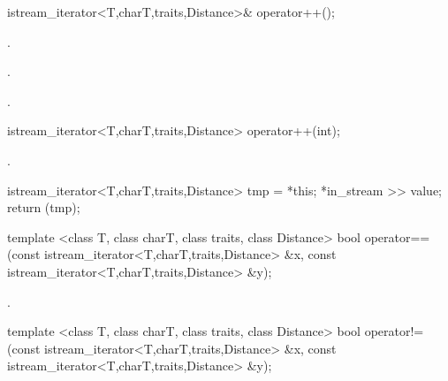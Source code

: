 %
%
\begin{itemdecl}
istream_iterator<T,charT,traits,Distance>& operator++();
\end{itemdecl}

\begin{itemdescr}
\pnum
\requires {}.

\pnum
\effects
{}.

\pnum
\returns
{}.
\end{itemdescr}

%
%
\begin{itemdecl}
istream_iterator<T,charT,traits,Distance> operator++(int);
\end{itemdecl}

\begin{itemdescr}
\pnum
\requires {}.

\pnum
\effects
\begin{codeblock}
istream_iterator<T,charT,traits,Distance> tmp = *this;
*in_stream >> value;
return (tmp);
\end{codeblock}
\end{itemdescr}

%
%
\begin{itemdecl}
template <class T, class charT, class traits, class Distance>
  bool operator==(const istream_iterator<T,charT,traits,Distance> &x,
                  const istream_iterator<T,charT,traits,Distance> &y);
\end{itemdecl}

\begin{itemdescr}
\pnum
\returns
{}.%
\end{itemdescr}

%
%
\begin{itemdecl}
template <class T, class charT, class traits, class Distance>
  bool operator!=(const istream_iterator<T,charT,traits,Distance> &x,
                  const istream_iterator<T,charT,traits,Distance> &y);
\end{itemdecl}

